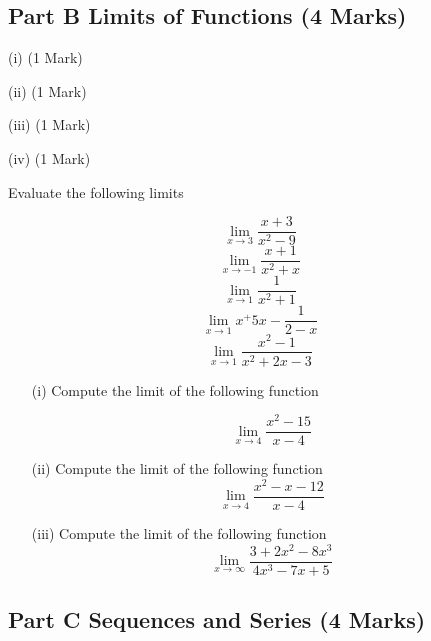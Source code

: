 \documentclass[11pt]{article} %
\begin{document}
\newpage
\subsection*{Part B Limits of Functions (4 Marks)}



\item[(i)](1 Mark)

\item[(ii)](1 Mark)

\item[(iii)](1 Mark)

\item[(iv)](1 Mark)




Evaluate the following limits

\[  \lim_{x\to 3} \frac{x+3}{x^2-9}       \]
\[  \lim_{x\to -1} \frac{x+1}{x^2+x}      \]
\[  \lim_{x\to 1} \frac{1}{x^2+1}          \]
\[  \lim_{x\to 1} x^ + 5x - \frac{1}{2-x}   \]
\[  \lim_{x\to 1} \frac{x^2-1}{x^2+2x-3}    \]


\begin{enumerate}
	\item[(i)]  Compute the limit of the following function
	
	\[\lim_{x \to 4 } \frac{x^2-15}{x-4}\]
	\vspace{1.5cm}
	\item[(ii)]  Compute the limit of the following function
	\vspace{1.5cm}
	\[\lim_{x \to 4 } \frac{x^2-x-12}{x-4}\]
	\vspace{1.5cm}
	\item[(iii)]  Compute the limit of the following function
	\[ \lim_{x \to \infty } \frac{3 + 2x^2 - 8x^3 }{4x^3 - 7x + 5} \]	
	
\end{enumerate}
\newpage
\subsection*{Part C Sequences and Series (4 Marks)}
\end{document}
